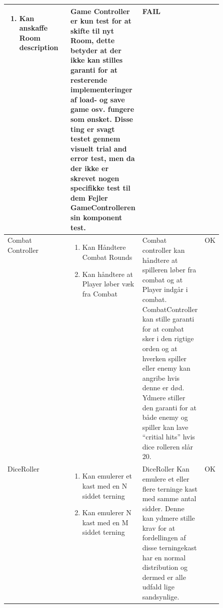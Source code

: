 \begin{center}
\begin{longtable}{|l|p{0.25\linewidth}|p{0.25\linewidth}|l|}
\begin{enumerate}
      \item \begin{flushleft} Kan anskaffe Room description \end{flushleft}
    \end{enumerate}
  &
  \flushleft 
  Game Controller er kun test for at skifte til nyt Room, dette betyder at der 
  ikke kan stilles garanti for at resterende implementeringer af load- og save game
  osv. fungere som ønsket. Disse ting er svagt testet gennem visuelt trial and error
  test, men da der ikke er skrevet nogen specifikke test til dem Fejler 
  GameControlleren sin komponent test.
  &
  FAIL
  \\ \hline
  Combat Controller
  &
  \begin{enumerate}
    \item \begin{flushleft} Kan Håndtere Combat Rounds \end{flushleft}
    \item \begin{flushleft} Kan håndtere at Player løber væk fra Combat \end{flushleft}
  \end{enumerate}
  &
  \flushleft
  Combat controller kan håndtere at spilleren løber fra combat og at Player indgår i combat.
  CombatController kan stille garanti for at combat sker i den rigtige orden og at hverken
  spiller eller enemy kan angribe hvis denne er død.
  Ydmere stiller den garanti for at både enemy og spiller kan lave ``critial hits'' hvis dice
  rolleren slår 20.
  &
  OK
  \\ \hline
  DiceRoller
  &
  \begin{enumerate}
    \item \begin{flushleft} Kan emulerer et kast med en N siddet terning \end{flushleft}
    \item \begin{flushleft} Kan emulerer N kast med en M siddet terning \end{flushleft}
  \end{enumerate}
  &
  \flushleft
  DiceRoller Kan emulere et eller flere terninge kast med samme antal sidder. Denne kan
  ydmere stille krav for at fordellingen af disse terningekast har en normal distribution 
  og dermed er alle udfald lige sandsynlige.
  &
  OK
  \\ \hline
  \end{longtable}
  \addtocounter{table}{-1}
\end{center}

